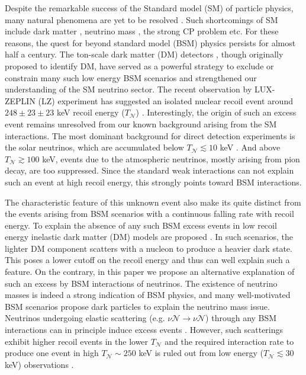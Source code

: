 \documentclass[prd,10pt,twocolumn,nofootinbib,preprint,superscriptaddress]{revtex4}
\newcommand{\nuc}{\mathcal{N}}
\begin{document}
Despite the remarkable success of the Standard model (SM) of particle physics, many natural phenomena are yet to be resolved \cite{ParticleDataGroup:2026mpi}.
Such shortcomings of SM include dark matter \cite{Cirelli:2024ssz}, neutrino mass \cite{T2K:2011ypd}, the strong CP problem etc. 
For these reasons, the quest for beyond standard model (BSM) physics persists for almost half a century.
The ton-scale dark matter (DM) detectors \cite{PandaX-II:2017hlx,XENON:2020kmp,
LUX-ZEPLIN:2018poe,DEAP:2019yzn}, though originally proposed to identify DM, have served as a powerful strategy to exclude or constrain many such low energy BSM scenarios and strengthened our understanding of the SM neutrino sector.
The recent observation by LUX-ZEPLIN (LZ) experiment has suggested an isolated nuclear recoil event around  
$248\pm 23\pm 23$ keV recoil energy ($T_{\mathcal{N}}$) \cite{LZ:2026axp}.
Interestingly, the origin of such an excess event remains unresolved 
from our known background arising from the SM interactions.
The most dominant background for direct detection experiments is the solar neutrinos, which are accumulated below $T_{\mathcal{N}}\lesssim 10$ keV \cite{LZ:2026axp}.
And above $T_{\mathcal{N}}\gtrsim 100$ keV, events due to
the atmospheric neutrinos, mostly arising from pion decay, are too suppressed.
Since the standard weak interactions can not explain such an event at high recoil energy, this strongly points toward BSM interactions.

The characteristic feature of this unknown event also make its quite distinct from the events arising from BSM scenarios with a continuous falling rate with recoil energy.
To explain the absence of any such BSM excess events in low recoil energy inelastic dark matter (DM) models are proposed \cite{Visinelli:2026kgt,Yamashita:2026ump,DiMauro:2026ldr,Lou:2026idn}. 
In such scenarios, the lighter DM component scatters with a nucleon to produce a heavier dark state.
This poses a lower cutoff on the recoil energy and thus can well explain such a feature.
On the contrary, in this paper we propose 
an alternative explanation of such an excess by BSM interactions of neutrinos.
The existence of neutrino masses is indeed a strong indication of BSM physics, and
many well-motivated BSM scenarios propose dark particles to explain the neutrino mass issue.
Neutrinos undergoing elastic scattering (e.g. $\nu \nuc \to \nu \nuc$) through any BSM interactions can in principle induce excess events \cite{DeRomeri:2022twg}.
However, such scatterings exhibit higher recoil events in the lower $T_\nuc$ and the required interaction rate to produce one event in high $T_\nuc\sim 250$ keV is ruled out from low energy ($T_\nuc\lesssim 30$ keV) observations \cite{DeRomeri:2022twg, Ahmed:2026knn}.
\end{document}
